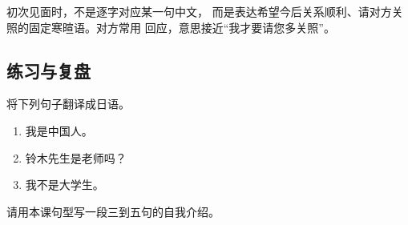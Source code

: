 \begin{culture}
  初次见面时，不是逐字对应某一句中文，
  而是表达希望今后关系顺利、请对方关照的固定寒暄语。对方常用
  回应，意思接近“我才要请您多关照”。
\end{culture}

\subsection*{练习与复盘}

\begin{practice}
  将下列句子翻译成日语。
  \begin{enumerate}
    \item 我是中国人。
    \item 铃木先生是老师吗？
    \item 我不是大学生。
  \end{enumerate}
  \answerline[3]
\end{practice}

\begin{practice}
  请用本课句型写一段三到五句的自我介绍。
  \answerline[5]
\end{practice}